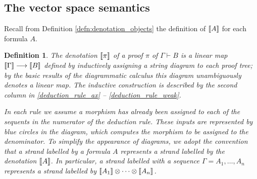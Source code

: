 \documentclass[english,letter paper,12pt,reqno]{article}
\theoremstyle{example}
\newtheorem{definition}[theorem]{Definition}
\begin{document}
\subsection{The vector space semantics}\label{section:vector_space_sem}

Recall from Definition \ref{defn:denotation_objects} the definition of $\llbracket A \rrbracket$ for each formula $A$.

\begin{definition}\label{defn:denotation_morphism} The \emph{denotation} $\llbracket \pi \rrbracket$ of a proof $\pi$ of $\Gamma \vdash B$ is a linear map $\llbracket \Gamma \rrbracket \longrightarrow \llbracket B \rrbracket$ defined by inductively assigning a string diagram to each proof tree; by the basic results of the diagrammatic calculus \cite{JSGoTCI} this diagram unambiguously denotes a linear map. The inductive construction is described by the second column in \eqref{deduction_rule_ax} -- \eqref{deduction_rule_weak}. 

In each rule we assume a morphism has already been assigned to each of the sequents in the numerator of the deduction rule. These inputs are represented by blue circles in the diagram, which computes the morphism to be assigned to the denominator. To simplify the appearance of diagrams, we adopt the convention that a strand labelled by a formula $A$ represents a strand labelled by the denotation $\llbracket A \rrbracket$. In particular, a strand labelled with a sequence $\Gamma = A_1,\ldots,A_n$ represents a strand labelled by $\llbracket A_1 \rrbracket \otimes \cdots \otimes \llbracket A_n \rrbracket$.
\end{definition}
\end{document}
